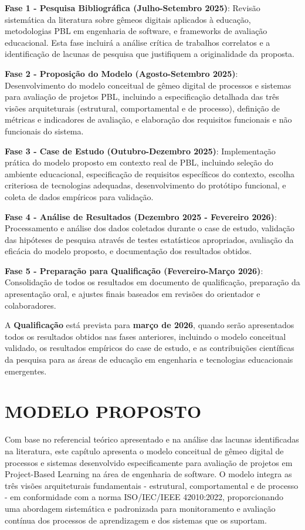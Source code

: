 \documentclass[12pt, a4paper, oneside, brazilian]{abntex2}
\begin{document}
\textbf{Fase 1 - Pesquisa Bibliográfica (Julho-Setembro 2025)}: Revisão sistemática da literatura sobre gêmeos digitais aplicados à educação, metodologias PBL em engenharia de software, e frameworks de avaliação educacional. Esta fase incluirá a análise crítica de trabalhos correlatos e a identificação de lacunas de pesquisa que justifiquem a originalidade da proposta.

\textbf{Fase 2 - Proposição do Modelo (Agosto-Setembro 2025)}: Desenvolvimento do modelo conceitual de gêmeo digital de processos e sistemas para avaliação de projetos PBL, incluindo a especificação detalhada das três visões arquiteturais (estrutural, comportamental e de processo), definição de métricas e indicadores de avaliação, e elaboração dos requisitos funcionais e não funcionais do sistema.

\textbf{Fase 3 - Case de Estudo (Outubro-Dezembro 2025)}: Implementação prática do modelo proposto em contexto real de PBL, incluindo seleção do ambiente educacional, especificação de requisitos específicos do contexto, escolha criteriosa de tecnologias adequadas, desenvolvimento do protótipo funcional, e coleta de dados empíricos para validação.

\textbf{Fase 4 - Análise de Resultados (Dezembro 2025 - Fevereiro 2026)}: Processamento e análise dos dados coletados durante o case de estudo, validação das hipóteses de pesquisa através de testes estatísticos apropriados, avaliação da eficácia do modelo proposto, e documentação dos resultados obtidos.

\textbf{Fase 5 - Preparação para Qualificação (Fevereiro-Março 2026)}: Consolidação de todos os resultados em documento de qualificação, preparação da apresentação oral, e ajustes finais baseados em revisões do orientador e colaboradores.

A \textbf{Qualificação} está prevista para \textbf{março de 2026}, quando serão apresentados todos os resultados obtidos nas fases anteriores, incluindo o modelo conceitual validado, os resultados empíricos do case de estudo, e as contribuições científicas da pesquisa para as áreas de educação em engenharia e tecnologias educacionais emergentes.

\section{MODELO PROPOSTO}

Com base no referencial teórico apresentado e na análise das lacunas identificadas na literatura, este capítulo apresenta o modelo conceitual de gêmeo digital de processos e sistemas desenvolvido especificamente para avaliação de projetos em Project-Based Learning na área de engenharia de software. O modelo integra as três visões arquiteturais fundamentais - estrutural, comportamental e de processo - em conformidade com a norma ISO/IEC/IEEE 42010:2022, proporcionando uma abordagem sistemática e padronizada para monitoramento e avaliação contínua dos processos de aprendizagem e dos sistemas que os suportam.
\end{document}
